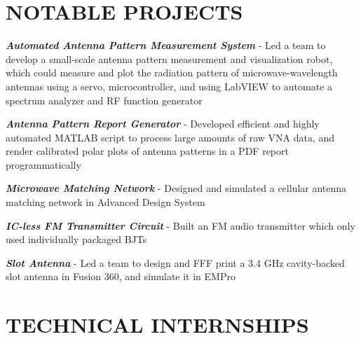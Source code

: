 \documentclass[margin,line]{resume}
\begin{document}
\begin{resume}
    \section{\mysidestyle \textbf{\large{N}\small{OTABLE }} \textbf{\large{P}\small{ROJECTS}}}

    \textbf{\textsl{Automated Antenna Pattern Measurement System
}} - Led a team to develop a small-scale antenna pattern measurement and visualization robot, which could measure and plot the radiation pattern of microwave-wavelength antennas using a servo, microcontroller, and using LabVIEW to automate a spectrum analyzer and RF function generator



\textbf{\textsl{Antenna Pattern Report Generator
}} - Developed efficient and highly automated MATLAB script to process large amounts of raw VNA data, and render calibrated polar plots of antenna patterns in a PDF report programmatically

\textbf{\textsl{Microwave Matching Network
}} - Designed and simulated a cellular antenna matching network in Advanced Design System

\textbf{\textsl{IC-less FM Transmitter Circuit
}} - Built an FM audio transmitter which only used individually packaged BJTs

\textbf{\textsl{Slot Antenna
}} - Led a team to design and FFF print a 3.4 GHz cavity-backed slot antenna in Fusion 360, and simulate it in EMPro




    \vspace{-1mm}

\sectionline

    \section{\mysidestyle \textbf{\large{T}\small{ECHNICAL} \large{I}\small{NTERNSHIPS}}}


\end{resume}
\end{document}
